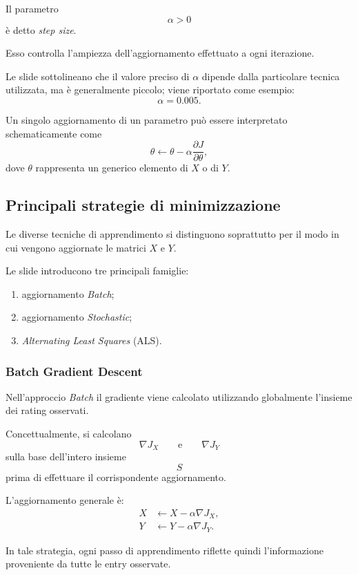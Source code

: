 Il parametro
\[
\alpha>0
\]
è detto \emph{step size}.

Esso controlla l'ampiezza dell'aggiornamento effettuato a ogni iterazione.

Le slide sottolineano che il valore preciso di $\alpha$ dipende dalla particolare tecnica utilizzata, ma è generalmente piccolo; viene riportato come esempio:
\[
\alpha=0.005.
\]

Un singolo aggiornamento di un parametro può essere interpretato schematicamente come
\[
\theta
\leftarrow
\theta
-
\alpha\frac{\partial J}{\partial\theta},
\]
dove $\theta$ rappresenta un generico elemento di $X$ o di $Y$.

\subsection{Principali strategie di minimizzazione}

Le diverse tecniche di apprendimento si distinguono soprattutto per il modo in cui vengono aggiornate le matrici $X$ e $Y$.

Le slide introducono tre principali famiglie:
\begin{enumerate}
    \item aggiornamento \emph{Batch};
    \item aggiornamento \emph{Stochastic};
    \item \emph{Alternating Least Squares} (ALS).
\end{enumerate}

\subsubsection{Batch Gradient Descent}

Nell'approccio \emph{Batch} il gradiente viene calcolato utilizzando globalmente l'insieme dei rating osservati.

Concettualmente, si calcolano
\[
\nabla J_X
\qquad\text{e}\qquad
\nabla J_Y
\]
sulla base dell'intero insieme
\[
S
\]
prima di effettuare il corrispondente aggiornamento.

L'aggiornamento generale è:
\begin{align*}
X &\leftarrow X-\alpha\nabla J_X,\\
Y &\leftarrow Y-\alpha\nabla J_Y.
\end{align*}

In tale strategia, ogni passo di apprendimento riflette quindi l'informazione proveniente da tutte le entry osservate.

